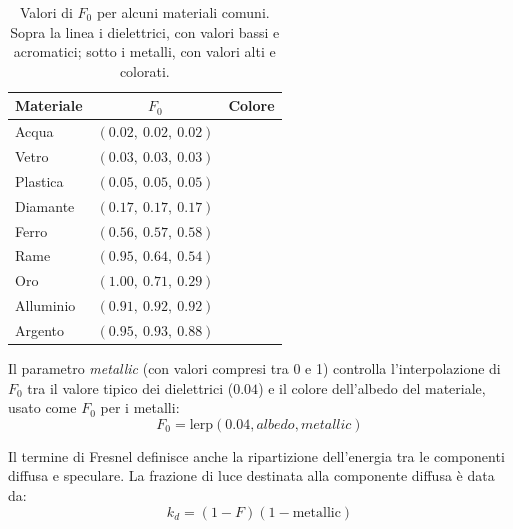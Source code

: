 \documentclass[12pt,a4paper,twoside]{book}
\begin{document}
\begin{table}[H]
    \centering
    \begin{tabular}{l c c}
        \hline
        \textbf{Materiale} & $F_0$ & \textbf{Colore}\\
        \hline
        Acqua              & $(0.02,\ 0.02,\ 0.02)$ & \colorbox[RGB]{5,5,5}{\phantom{XX}} \\
        Vetro              & $(0.03,\ 0.03,\ 0.03)$ & \colorbox[RGB]{8,8,8}{\phantom{XX}} \\
        Plastica           & $(0.05,\ 0.05,\ 0.05)$ & \colorbox[RGB]{13,13,13}{\phantom{XX}} \\
        Diamante           & $(0.17,\ 0.17,\ 0.17)$ & \colorbox[RGB]{43,43,43}{\phantom{XX}} \\
        \hline
        Ferro              & $(0.56,\ 0.57,\ 0.58)$ & \colorbox[RGB]{143,145,148}{\phantom{XX}} \\
        Rame               & $(0.95,\ 0.64,\ 0.54)$ & \colorbox[RGB]{242,163,138}{\phantom{XX}} \\
        Oro                & $(1.00,\ 0.71,\ 0.29)$ & \colorbox[RGB]{255,181,74}{\phantom{XX}} \\
        Alluminio          & $(0.91,\ 0.92,\ 0.92)$ & \colorbox[RGB]{232,235,235}{\phantom{XX}} \\
        Argento            & $(0.95,\ 0.93,\ 0.88)$ & \colorbox[RGB]{242,237,224}{\phantom{XX}} \\
        \hline
    \end{tabular}
    \caption[Valori di $F_0$ per alcuni materiali comuni]{Valori di $F_0$ per alcuni materiali comuni. Sopra la linea i dielettrici, con valori bassi e acromatici; sotto i metalli, con valori alti e colorati.}
    \label{tab:f0-valori}
\end{table}

Il parametro \textit{metallic} (con valori compresi tra 0 e 1) controlla l'interpolazione di $F_0$ tra il valore tipico dei dielettrici ($0.04$) e il colore dell'albedo del materiale, usato come $F_0$ per i metalli:
\begin{equation}
    F_0 = \text{lerp}(0.04, \textit{albedo}, \textit{metallic})
    \label{eq:f0-metallic}
\end{equation}

Il termine di Fresnel definisce anche la ripartizione dell'energia tra le componenti diffusa e speculare. La frazione di luce destinata alla componente diffusa è data da:
\begin{equation}
    k_d = (1 - F)(1 - \text{metallic})
    \label{eq:kd}
\end{equation}
\end{document}

